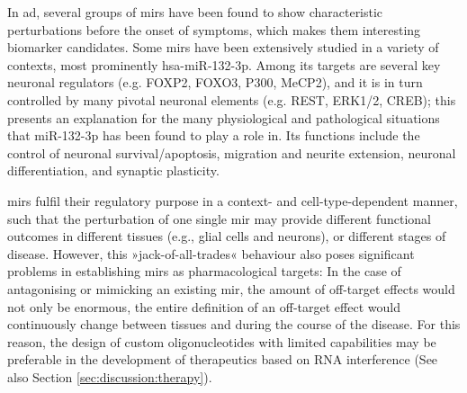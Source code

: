 In \ac{ad}, several groups of \acp{mir} have been found to show characteristic perturbations before the onset of symptoms, which makes them interesting biomarker candidates.\cite{Salta2017a} Some \acp{mir} have been extensively studied in a variety of contexts, most prominently hsa-miR-132-3p. Among its targets are several key neuronal regulators (e.g. FOXP2, FOXO3, P300, MeCP2), and it is in turn controlled by many pivotal neuronal elements (e.g. REST, ERK1/2, CREB); this presents an explanation for the many physiological and pathological situations that miR-132-3p has been found to play a role in. Its functions include the control of neuronal survival/apoptosis, migration and neurite extension, neuronal differentiation, and synaptic plasticity. 

\acp{mir} fulfil their regulatory purpose in a context- and cell-type-dependent manner,\cite{Lu2015} such that the perturbation of one single \ac{mir} may provide different functional outcomes in different tissues (e.g., glial cells and neurons), or different stages of disease. However, this »jack-of-all-trades« behaviour also poses significant problems in establishing \acp{mir} as pharmacological targets: In the case of antagonising or mimicking an existing \ac{mir}, the amount of off-target effects would not only be enormous, the entire definition of an off-target effect would continuously change between tissues and during the course of the disease. For this reason, the design of custom oligonucleotides with limited capabilities may be preferable in the development of therapeutics based on RNA interference (See also Section \ref{sec:discussion:therapy}).

